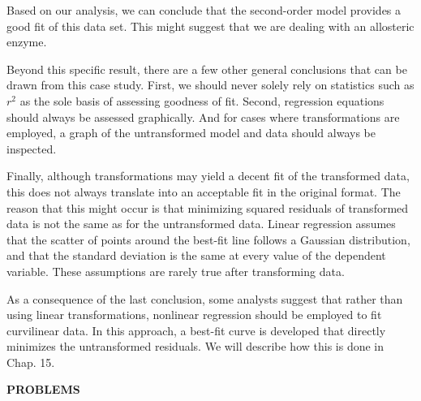\documentclass[../main.tex]{subfiles}
\begin{document}
Based on our analysis, we can conclude that the second-order model provides a good fit of this data set. This might suggest that we are dealing with an allosteric enzyme. 

Beyond this specific result, there are a few other general conclusions that can be drawn from this case study. First, we should never solely rely on statistics such as $r^2$ as the sole basis of assessing goodness of fit. Second, regression equations should always be assessed graphically. And for cases where transformations are employed, a graph of the untransformed model and data should always be inspected. 

Finally, although transformations may yield a decent fit of the transformed data, this does not always translate into an acceptable fit in the original format. The reason that this might occur is that minimizing squared residuals of transformed data is not the same as for the untransformed data. Linear regression assumes that the scatter of points around the best-fit line follows a Gaussian distribution,  and that the standard deviation is the same at every value of the dependent variable. These assumptions are rarely true after transforming data. 

As a consequence of the last conclusion, some analysts suggest that rather than using linear transformations, nonlinear regression should be employed to fit curvilinear data. In this approach, a best-fit curve is developed that directly minimizes the untransformed residuals. We will describe how this is done in Chap. 15.

\setlength{\tabcolsep}{3pt}

\bigskip
\noindent\textbf{PROBLEMS}\\
\end{document}
